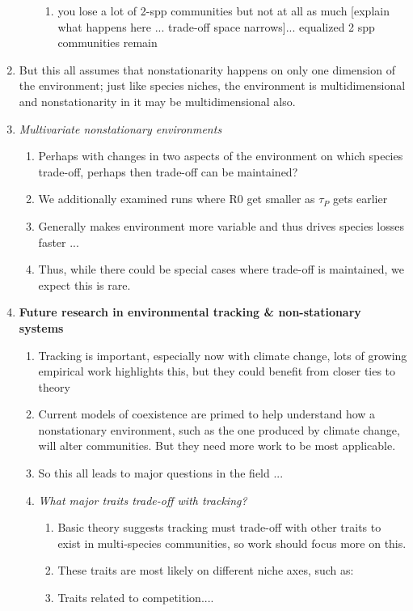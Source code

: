 \documentclass[11pt,letterpaper]{article}
\begin{document}
\begin{enumerate}
\begin{enumerate}
\begin{enumerate}
\item you lose a lot of 2-spp communities but not at all as much [explain what happens here ... trade-off space narrows]... equalized 2 spp communities remain
\end{enumerate}
\end{enumerate}
\item But this all assumes that nonstationarity happens on only one dimension of the environment; just like species niches, the environment is multidimensional and nonstationarity in it may be multidimensional also. 
\item \emph{Multivariate nonstationary environments}
\begin{enumerate}
\item Perhaps with changes in two aspects of the environment on which species trade-off, perhaps then trade-off can be maintained? 
\item We additionally examined runs where R0 get smaller as $\tau_{P}$ gets earlier
\item Generally makes environment more variable and thus drives species losses faster ... 
\item Thus, while there could be special cases where trade-off is maintained, we expect this is rare. 
\end{enumerate}
\item {\bf Future research in environmental tracking \& non-stationary systems}
\begin{enumerate}
\item Tracking is important, especially now with climate change, lots of growing empirical work highlights this, but they could benefit from closer ties to theory
\item Current models of coexistence are primed to help understand how a nonstationary environment, such as the one produced by climate change, will alter communities. But they need more work to be most applicable. 
\item So this all leads to major questions in the field ...
\item \emph{What major traits trade-off with tracking? }
\begin{enumerate}
\item Basic theory suggests tracking must trade-off with other traits to exist in multi-species communities, so work should focus more on this. 
\item These traits are most likely on different niche axes, such as: 
\item Traits related to competition....

\end{enumerate}
\end{enumerate}
\end{enumerate}
\end{document}
